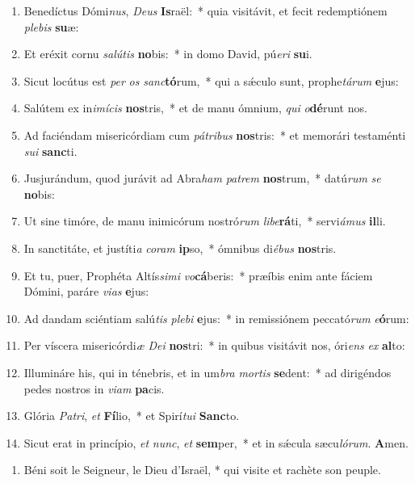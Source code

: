 \documentclass[twoside]{article}
\begin{document}
\begin{paracol}[1]{2}

\switchcolumn*

\begin{enumerate}[wide, itemsep=0mm, labelwidth=!, labelindent=0pt, label=\color{gregoriocolor}\theenumi]
\item Benedíctus Dómi\textit{nus}, \textit{De}\textit{us} \textbf{Is}raël:~* quia visitávit, et fecit redemptiónem \textit{ple}\textit{bis} \textbf{su}æ:
\item Et eréxit cornu \textit{sa}\textit{lú}\textit{tis} \textbf{no}bis:~* in domo David, pú\textit{e}\textit{ri} \textbf{su}i.
\item Sicut locútus est \textit{per} \textit{os} \textit{sanc}\textbf{tó}rum,~* qui a sǽculo sunt, prophe\textit{tá}\textit{rum} \textbf{e}jus:
\item Salútem ex in\textit{i}\textit{mí}\textit{cis} \textbf{nos}tris,~* et de manu ómnium, \textit{qui} \textit{o}\textbf{dé}runt nos.
\item Ad faciéndam misericórdiam cum \textit{pá}\textit{tri}\textit{bus} \textbf{nos}tris:~* et memorári testaménti \textit{su}\textit{i} \textbf{sanc}ti.
\item Jusjurándum, quod jurávit ad Abra\textit{ham} \textit{pa}\textit{trem} \textbf{nos}trum,~* datú\textit{rum} \textit{se} \textbf{no}bis:
\item Ut sine timóre, de manu inimicórum nostró\textit{rum} \textit{li}\textit{be}\textbf{rá}ti,~* servi\textit{á}\textit{mus} \textbf{il}li.
\item In sanctitáte, et justíti\textit{a} \textit{co}\textit{ram} \textbf{ip}so,~* ómnibus di\textit{é}\textit{bus} \textbf{nos}tris.
\item Et tu, puer, Prophéta Altís\textit{si}\textit{mi} \textit{vo}\textbf{cá}beris:~* præíbis enim ante fáciem Dómini, paráre \textit{vi}\textit{as} \textbf{e}jus:
\item Ad dandam sciéntiam salú\textit{tis} \textit{ple}\textit{bi} \textbf{e}jus:~* in remissiónem peccató\textit{rum} \textit{e}\textbf{ó}rum:
\item Per víscera misericórdi\textit{æ} \textit{De}\textit{i} \textbf{nos}tri:~* in quibus visitávit nos, óri\textit{ens} \textit{ex} \textbf{al}to:
\item Illumináre his, qui in ténebris, et in um\textit{bra} \textit{mor}\textit{tis} \textbf{se}dent:~* ad dirigéndos pedes nostros in \textit{vi}\textit{am} \textbf{pa}cis.
\item Glória \textit{Pa}\textit{tri}, \textit{et} \textbf{Fí}lio,~* et Spirí\textit{tu}\textit{i} \textbf{Sanc}to.
\item Sicut erat in princípio, \textit{et} \textit{nunc}, \textit{et} \textbf{sem}per,~* et in sǽcula sæcu\textit{ló}\textit{rum}. \textbf{A}men.
\end{enumerate}
\switchcolumn
\begin{enumerate}[wide, itemsep=0mm, labelwidth=!, labelindent=0pt, label=\color{gregoriocolor}\theenumi]
\item Béni soit le Seigneur, le Dieu d'Israël, *
qui visite et rachète son peuple.


\end{enumerate}
\end{paracol}
\end{document}
